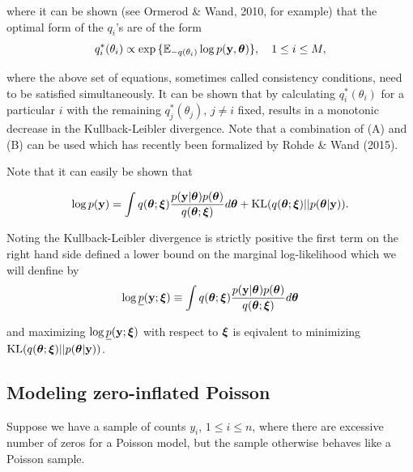 \documentclass{article}[12pt]
\begin{document}
\noindent where it can be shown (see Ormerod \& Wand, 2010, for example) that the optimal form of the
$q_i$'s are of the form
\begin{equation}\label{eq:consistency}
	q_i^*(\theta_i) \propto \exp{\{ {\mathbb E}_{-q(\theta_i)} \log p({\bf y}, {\boldsymbol\theta}) \}},  \quad 1\le i\le M,
\end{equation}

\noindent where the above set of equations, sometimes called consistency conditions, need to be 
satisfied simultaneously. It can be shown that by calculating $q_i^*(\theta_i)$ for a particular
$i$ with the remaining $q_j^*(\theta_j)$, $j\ne i$ fixed, results in a monotonic decrease in the 
Kullback-Leibler divergence. Note that a combination of (A) and (B) can be used which has recently
been formalized by Rohde \& Wand (2015). 

\noindent Note that it can easily be shown that

$$
\displaystyle \log p({\bf y}) = \int q({\boldsymbol \theta};{\boldsymbol \xi})\frac{p({\bf y}|{\boldsymbol \theta})p({\boldsymbol \theta})}{q({\boldsymbol \theta};{\boldsymbol \xi})} d{\boldsymbol \theta} + \text{KL}(q({\boldsymbol \theta};{\boldsymbol \xi})||p({\boldsymbol \theta}|{\bf y})).
$$

\noindent Noting the Kullback-Leibler divergence is strictly positive the first term on the right hand side
defined a lower bound on the marginal log-likelihood which we will denfine by
$$
\displaystyle \log \underline{p}({\bf y};{\boldsymbol \xi}) \equiv \int q({\boldsymbol \theta};{\boldsymbol \xi})\frac{p({\bf y}|{\boldsymbol \theta})p({\boldsymbol \theta})}{q({\boldsymbol \theta};{\boldsymbol \xi})} d{\boldsymbol \theta}
$$

\noindent and maximizing $\log \underline{p}({\bf y};{\boldsymbol \xi})$ with respect to ${\boldsymbol \xi}$ is eqivalent to minimizing
$\text{KL}(q({\boldsymbol \theta};{\boldsymbol \xi})||p({\boldsymbol \theta}|{\bf y}))$.


\subsection{Modeling zero-inflated Poisson}

Suppose we have a sample of counts $y_i$, $1\le i\le n$, where there are excessive number of zeros 
for a Poisson model, but the sample otherwise behaves like a Poisson sample.
\end{document}
